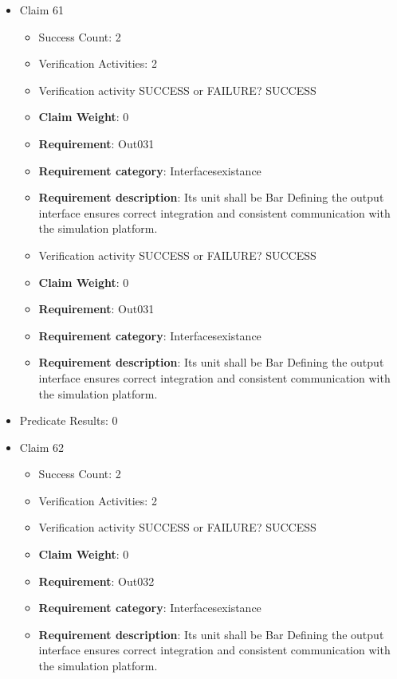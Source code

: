 \documentclass{article}
\begin{document}
\begin{itemize}
  				  \item Claim 61
				\begin{itemize}
			    	\item Success Count: 2 
			    	\item Verification Activities: 2
					\item Verification activity SUCCESS or FAILURE? SUCCESS
					\item \textbf{Claim Weight}: 0
						\item \textbf{Requirement}: Out031 
						\item \textbf{Requirement category}: Interfacesexistance 
						\item \textbf{Requirement description}: Its unit shall be Bar Defining the output interface ensures correct integration and consistent communication with the simulation platform.
					
					\item Verification activity SUCCESS or FAILURE? SUCCESS
					\item \textbf{Claim Weight}: 0
						\item \textbf{Requirement}: Out031 
						\item \textbf{Requirement category}: Interfacesexistance 
						\item \textbf{Requirement description}: Its unit shall be Bar Defining the output interface ensures correct integration and consistent communication with the simulation platform.
					
				\end{itemize}
				
									    
				\item Predicate Results: 0

  				  \item Claim 62
				\begin{itemize}
			    	\item Success Count: 2 
			    	\item Verification Activities: 2
					\item Verification activity SUCCESS or FAILURE? SUCCESS
					\item \textbf{Claim Weight}: 0
						\item \textbf{Requirement}: Out032 
						\item \textbf{Requirement category}: Interfacesexistance 
						\item \textbf{Requirement description}: Its unit shall be Bar Defining the output interface ensures correct integration and consistent communication with the simulation platform.
					

\end{itemize}
\end{itemize}
\end{document}
